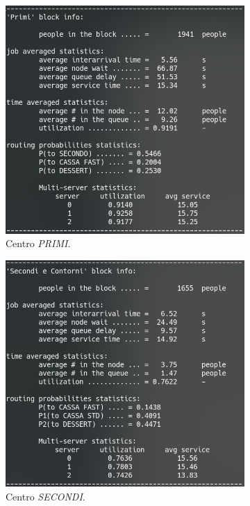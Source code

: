 \documentclass{article}
\begin{document}
\begin{figure}[H]
\begin{subfigure}{.5\textwidth}
  \centering
  \includegraphics[width=.8\linewidth]{img/primi.png}
  \caption{Centro \textit{PRIMI}.}
  \label{fig:primo}
\end{subfigure}
\begin{subfigure}{.5\textwidth}
  \centering
  \includegraphics[width=.8\linewidth]{img/secondi.png}
  \caption{Centro \textit{SECONDI}.}
  \label{fig:secondo}
\end{subfigure}
\begin{subfigure}{.5\textwidth}
  \centering

\end{subfigure}
\end{figure}
\end{document}
